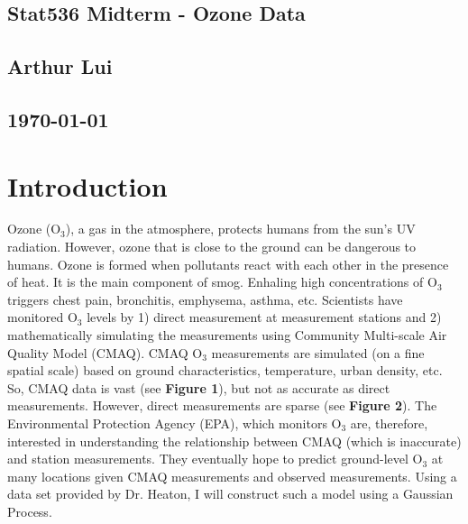 \documentclass{article}                                                   %
\begin{document}
\begin{center}                                                            %
  \section*{\textbf{Stat536 Midterm - Ozone Data}}                        %
  \subsection*{\textbf{Arthur Lui}}                                       %
  \subsection*{\noindent\today}                                           %
\end{center}                                                              %

\section{Introduction}
  Ozone (O$_3$), a gas in the atmosphere, protects humans from the sun's UV
  radiation. However, ozone that is close to the ground can be dangerous to
  humans. Ozone is formed when pollutants react with each other in the presence
  of heat. It is the main component of smog. Enhaling high concentrations of
  O$_3$ triggers chest pain, bronchitis, emphysema, asthma, etc. Scientists have
  monitored O$_3$ levels by 1) direct measurement at measurement stations and 2)
  mathematically simulating the measurements using Community Multi-scale Air
  Quality Model (CMAQ). CMAQ O$_3$ measurements are simulated (on a fine spatial
  scale) based on ground characteristics, temperature, urban density, etc.  So,
  CMAQ data is vast (see \textbf{Figure 1}), but not as accurate as direct
  measurements. However, direct measurements are sparse (see \textbf{Figure 2}).
  The Environmental Protection Agency (EPA), which monitors O$_3$ are,
  therefore, interested in understanding the relationship between CMAQ (which is
  inaccurate) and station measurements. They eventually hope to predict
  ground-level O$_3$ at many locations given CMAQ measurements and observed
  measurements. Using a data set provided by Dr.  Heaton, I will construct such
  a model using a Gaussian
  Process.
\end{document}
